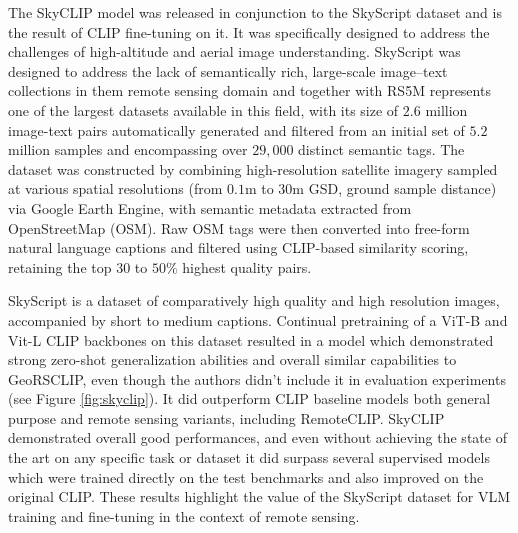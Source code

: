 \documentclass[a4paper, oneside, english]{sapthesis} %
\begin{document}
The SkyCLIP model \cite{wang2024skyscript} was released in conjunction to the SkyScript dataset and is the result of CLIP fine-tuning on it. It was specifically designed to address the challenges of high-altitude and aerial image understanding. SkyScript was designed to address the lack of semantically rich, large-scale image–text collections in them remote sensing domain and together with RS5M \cite{zhang2024rs5m} represents one of the largest datasets available in this field, with its size of $2.6$ million image-text pairs automatically generated and filtered from an initial set of $5.2$ million samples and encompassing over $29,000$ distinct semantic tags. The dataset was constructed by combining high-resolution satellite imagery sampled at various spatial resolutions (from $0.1$m to $30$m GSD, ground sample distance) via Google Earth Engine, with semantic metadata extracted from OpenStreetMap (OSM). Raw OSM tags were then converted into free-form natural language captions and filtered using CLIP-based similarity scoring, retaining the top $30$ to $50\%$ highest quality pairs.

SkyScript is a dataset of comparatively high quality and high resolution images, accompanied by short to medium captions. Continual pretraining of a ViT-B and Vit-L CLIP backbones on this dataset resulted in a model which demonstrated strong zero-shot generalization abilities and overall similar capabilities to GeoRSCLIP, even though the authors didn't include it in evaluation experiments (see Figure \ref{fig:skyclip}). It did outperform CLIP baseline models both general purpose and remote sensing variants, including RemoteCLIP. SkyCLIP demonstrated overall good performances, and even without achieving the state of the art on any specific task or dataset it did surpass several supervised models which were trained directly on the test benchmarks and also improved on the original CLIP. These results highlight the value of the SkyScript dataset for VLM training and fine-tuning in the context of remote sensing.
\end{document}
